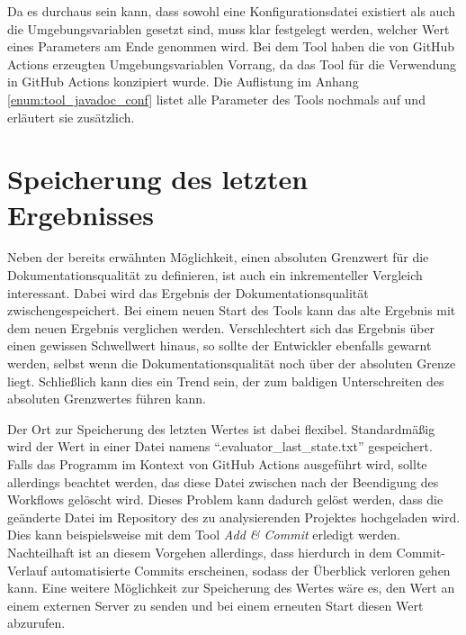 Da es durchaus sein kann, dass sowohl eine Konfigurationsdatei existiert als auch die Umgebungsvariablen gesetzt sind, muss klar festgelegt werden, welcher Wert eines Parameters am Ende genommen wird. Bei dem Tool haben die von GitHub Actions erzeugten Umgebungsvariablen  Vorrang, da das Tool für die Verwendung in GitHub Actions konzipiert wurde.  Die Auflistung im Anhang \ref{enum:tool_javadoc_conf} listet alle Parameter des Tools nochmals auf und erläutert sie zusätzlich. 

\begin{comment}
Das Tool \textit{create\_conf}, das im Hauptverzeichnis im GitHub-Repository liegt kann eine beispielhafte Konfigurationsdatei erstellen, indem \textit{node create\_conf.js --out PATH --type json} aufgerufen wird. Dabei ist \textit{PATH} ein Pfad ohne Dateiname. Dieses Hilfstool legt dann eine Konfigurationsdatei namens \enquote{comment\_conf.json} in dem angegebenen Verzeichnis an. 
\end{comment}
\section{Speicherung des letzten Ergebnisses}\label{chapter:saving}
Neben der bereits erwähnten Möglichkeit, einen absoluten Grenzwert für die Dokumentationsqualität zu definieren, ist auch ein inkrementeller Vergleich interessant. Dabei wird das Ergebnis der Dokumentationsqualität zwischengespeichert. Bei einem neuen Start des Tools kann das alte Ergebnis mit dem neuen Ergebnis verglichen werden. Verschlechtert sich das Ergebnis über einen gewissen Schwellwert hinaus, so sollte der Entwickler ebenfalls gewarnt werden, selbst wenn die Dokumentationsqualität noch über der absoluten Grenze liegt. Schließlich kann dies ein Trend sein, der zum baldigen Unterschreiten des absoluten Grenzwertes führen kann. 

Der Ort zur Speicherung des letzten Wertes ist dabei flexibel. Standardmäßig wird der Wert in einer Datei namens \enquote{.evaluator\_last\_state.txt} gespeichert. Falls das Programm im Kontext von GitHub Actions ausgeführt wird, sollte allerdings beachtet werden, das diese Datei zwischen nach der Beendigung des Workflows gelöscht wird. Dieses Problem kann dadurch gelöst werden, dass die geänderte Datei im Repository des zu analysierenden Projektes hochgeladen wird. Dies kann beispielsweise mit dem Tool \textit{Add \& Commit} \cite{add_commit} erledigt werden. Nachteilhaft ist an diesem Vorgehen allerdings, dass hierdurch in dem Commit-Verlauf automatisierte Commits erscheinen, sodass der Überblick verloren gehen kann.  Eine weitere Möglichkeit zur Speicherung des Wertes wäre es, den Wert an einem externen Server zu senden und bei einem erneuten Start diesen Wert abzurufen. 

